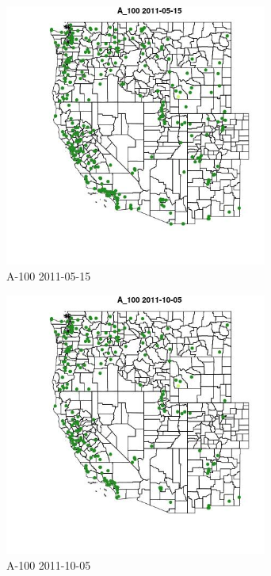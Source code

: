 \begin{figure} 
\centering  
\includegraphics[width=0.77\textwidth]{Code_Outputs/ML_input_report_ML_input_PM25_Step5_part_d_de_duplicated_aves_ML_input_MapObsA_1002011-05-15.jpg} 
\caption{\label{fig:ML_input_report_ML_input_PM25_Step5_part_d_de_duplicated_aves_ML_inputMapObsA_1002011-05-15}A-100 2011-05-15} 
\end{figure} 
 

\begin{figure} 
\centering  
\includegraphics[width=0.77\textwidth]{Code_Outputs/ML_input_report_ML_input_PM25_Step5_part_d_de_duplicated_aves_ML_input_MapObsA_1002011-10-05.jpg} 
\caption{\label{fig:ML_input_report_ML_input_PM25_Step5_part_d_de_duplicated_aves_ML_inputMapObsA_1002011-10-05}A-100 2011-10-05} 
\end{figure} 
 

